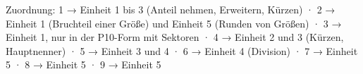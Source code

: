 
Zuordnung: 1 → Einheit 1 bis 3 (Anteil nehmen, Erweitern, Kürzen) · 2 → Einheit 1 (Bruchteil einer Größe) und Einheit 5 (Runden von Größen) · 3 → Einheit 1, nur in der P10-Form mit Sektoren · 4 → Einheit 2 und 3 (Kürzen, Hauptnenner) · 5 → Einheit 3 und 4 · 6 → Einheit 4 (Division) · 7 → Einheit 5 · 8 → Einheit 5 · 9 → Einheit 5

